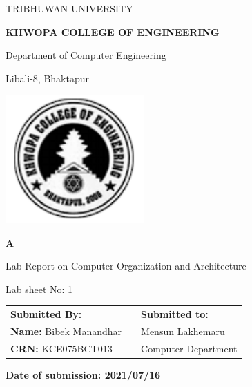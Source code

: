 \documentclass[12pt]{report}
\begin{document}
\begin{center}
    \renewcommand{\arraystretch}{1.5}
    \sffamily
    \large
    \parskip=10pt
    \MakeUppercase{TRIBHUWAN UNIVERSITY}

    \MakeUppercase{\bfseries\LARGE KHWOPA COLLEGE OF ENGINEERING}

    Department of Computer Engineering

    Libali-8, Bhaktapur
    \parskip=60pt

    \includegraphics[width=150pt]{images/logo.png}

    \bfseries
    A
    \parskip=10pt

    Lab Report on Computer Organization and Architecture

    Lab sheet No: 1
    \parskip=60pt

    \normalfont
    \begin{tabular}{@{}lp{2cm}l@{}}
        \textbf{Submitted By:}                     &  & \textbf{Submitted to:} \\
        \textbf{Name:} Bibek Manandhar             &  & Mensun Lakhemaru       \\
        \textbf{CRN:} \MakeUppercase{kce075bct013} &  & Computer Department
    \end{tabular}

    \bfseries
    Date of submission: 2021/07/16
\end{center}
\end{document}
